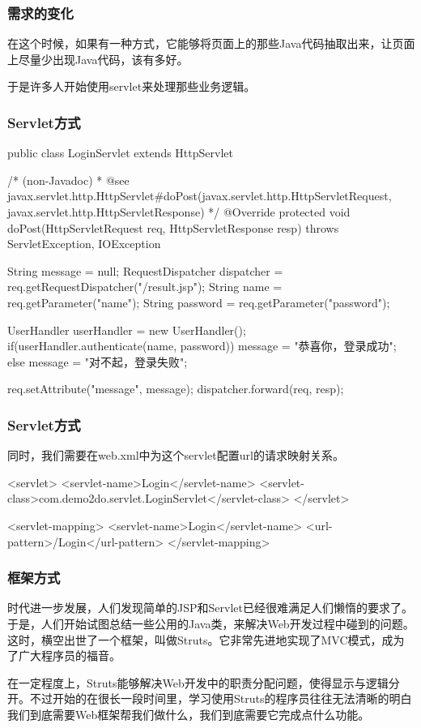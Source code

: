 \begin{frame}[fragile] %
\frametitle{需求的变化}

在这个时候，如果有一种方式，它能够将页面上的那些Java代码抽取出来，让页面上尽量少出现Java代码，该有多好。

{\Blue\hei 于是许多人开始使用servlet来处理那些业务逻辑。 }

\end{frame}

\begin{frame}[fragile] %
\frametitle{Servlet方式}

\begin{javaCode}
public class LoginServlet extends HttpServlet {
  
  /* (non-Javadoc)
  * @see javax.servlet.http.HttpServlet#doPost(javax.servlet.http.HttpServletRequest, 
  javax.servlet.http.HttpServletResponse)
  */
  @Override
  protected void doPost(HttpServletRequest req, HttpServletResponse resp) 
  throws ServletException, IOException {
    String message = null;
    RequestDispatcher dispatcher = req.getRequestDispatcher("/result.jsp");
    String name = req.getParameter("name");
    String password = req.getParameter("password");
    
    UserHandler userHandler = new UserHandler();
    if(userHandler.authenticate(name, password)) {
      message = "恭喜你，登录成功";
    } else {
      message = "对不起，登录失败";
    }
    
    req.setAttribute("message", message);
    dispatcher.forward(req, resp);
  }
}
\end{javaCode}
\end{frame}

\begin{frame}[fragile] %
\frametitle{Servlet方式}

同时，我们需要在web.xml中为这个servlet配置url的请求映射关系。 

\begin{xmlCode}
<servlet>
  <servlet-name>Login</servlet-name>
  <servlet-class>com.demo2do.servlet.LoginServlet</servlet-class>
</servlet>

<servlet-mapping>
  <servlet-name>Login</servlet-name>
  <url-pattern>/Login</url-pattern>
</servlet-mapping>
\end{xmlCode}
\end{frame}

\begin{frame}[fragile] %
\frametitle{框架方式}

时代进一步发展，人们发现简单的JSP和Servlet已经很难满足人们懒惰的要求了。于是，人们开始试图总结一些公用的Java类，来解决Web开发过程中碰到的问题。这时，横空出世了一个框架，叫做Struts。它非常先进地实现了{\hei\Red MVC模式}，成为了广大程序员的福音。 

在一定程度上，Struts能够解决Web开发中的职责分配问题，使得显示与逻辑分开。不过开始的在很长一段时间里，学习使用Struts的程序员往往无法清晰的明白我们到底需要Web框架帮我们做什么，我们到底需要它完成点什么功能。
\end{frame}

